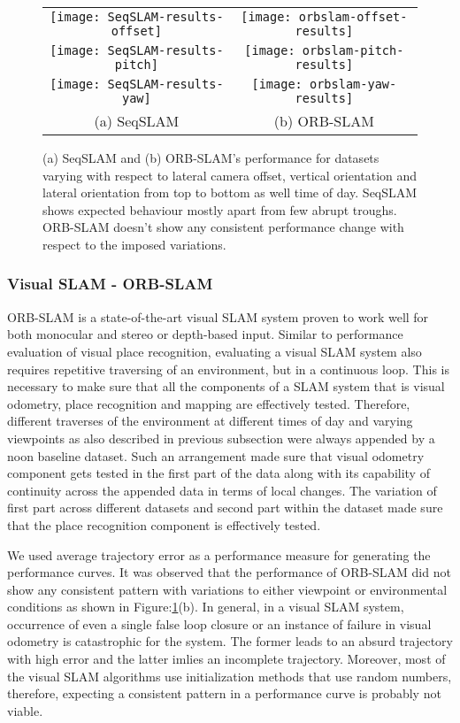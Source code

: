 \documentclass{article}
\begin{document}
\begin{figure}
\centering
\begin{tabular}{cc}
	\texttt{[image: SeqSLAM-results-offset]}&
	\texttt{[image: orbslam-offset-results]}\\
	
	\texttt{[image: SeqSLAM-results-pitch]}&	
	\texttt{[image: orbslam-pitch-results]}\\
	
	\texttt{[image: SeqSLAM-results-yaw]}&
	\texttt{[image: orbslam-yaw-results]}\\
	
	(a) SeqSLAM & (b) ORB-SLAM \\
\end{tabular}
	\caption{ (a) SeqSLAM and (b) ORB-SLAM's performance for datasets varying with respect to lateral camera offset, vertical orientation and lateral orientation from top to bottom as well time of day. SeqSLAM shows expected behaviour mostly apart from few abrupt troughs. ORB-SLAM doesn't show any consistent performance change with respect to the imposed variations.}
	\label{fig:slamCharacterize}
\end{figure}

\subsubsection{Visual SLAM - ORB-SLAM}
ORB-SLAM is a state-of-the-art visual SLAM system proven to work well for both monocular and stereo or depth-based input. Similar to performance evaluation of visual place recognition, evaluating a visual SLAM system also requires repetitive traversing of an environment, but in a continuous loop. This is necessary to make sure that all the components of a SLAM system that is visual odometry, place recognition and mapping are effectively tested. Therefore, different traverses of the environment at different times of day and varying viewpoints as also described in previous subsection were always appended by a noon baseline dataset. Such an arrangement made sure that visual odometry component gets tested in the first part of the data along with its capability of continuity across the appended data in terms of local changes. The variation of first part across different datasets and second part within the dataset made sure that the place recognition component is effectively tested.

We used average trajectory error as a performance measure for generating the performance curves. It was observed that the performance of ORB-SLAM did not show any consistent pattern with variations to either viewpoint or environmental conditions as shown in Figure:\ref{fig:slamCharacterize}(b). In general, in a visual SLAM system, occurrence of even a single false loop closure or an instance of failure in visual odometry is catastrophic for the system. The former leads to an absurd trajectory with high error and the latter imlies an incomplete trajectory. Moreover, most of the visual SLAM algorithms use initialization methods that use random numbers, therefore, expecting a consistent pattern in a performance curve is probably not viable.
\end{document}

